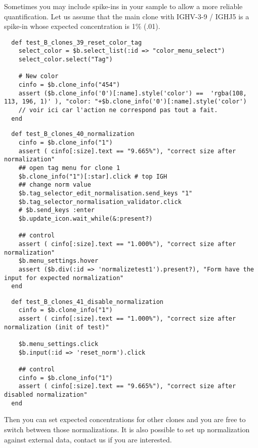 Sometimes you may include spike-ins in your sample to allow a more reliable
quantification.
Let us assume that the main clone with IGHV-3-9 / IGHJ5 is a spike-in whose
expected concentration is 1\% (.01).

\begin{verbatim}
  def test_B_clones_39_reset_color_tag
    select_color = $b.select_list(:id => "color_menu_select")
    select_color.select("Tag")

    # New color
    cinfo = $b.clone_info("454")
    assert ($b.clone_info('0')[:name].style('color') ==  'rgba(108, 113, 196, 1)' ), "color: "+$b.clone_info('0')[:name].style('color')
    // voir ici car l'action ne correspond pas tout a fait.
  end
\end{verbatim}

\begin{verbatim}
  def test_B_clones_40_normalization
    cinfo = $b.clone_info("1")
    assert ( cinfo[:size].text == "9.665%"), "correct size after normalization"
    ## open tag menu for clone 1
    $b.clone_info("1")[:star].click # top IGH
    ## change norm value
    $b.tag_selector_edit_normalisation.send_keys "1"
    $b.tag_selector_normalisation_validator.click
    # $b.send_keys :enter
    $b.update_icon.wait_while(&:present?)

    ## control
    assert ( cinfo[:size].text == "1.000%"), "correct size after normalization"
    $b.menu_settings.hover
    assert ($b.div(:id => 'normalizetest1').present?), "Form have the input for expected normalization"
  end
\end{verbatim}

\begin{verbatim}
  def test_B_clones_41_disable_normalization
    cinfo = $b.clone_info("1")
    assert ( cinfo[:size].text == "1.000%"), "correct size after normalization (init of test)"
    
    $b.menu_settings.click
    $b.input(:id => 'reset_norm').click

    ## control
    cinfo = $b.clone_info("1")
    assert ( cinfo[:size].text == "9.665%"), "correct size after disabled normalization"
  end
\end{verbatim}

Then you can set expected concentrations for other clones and you are free to
switch between those normalizations.
It is also possible to set up normalization against external data,
contact us if you are interested.

